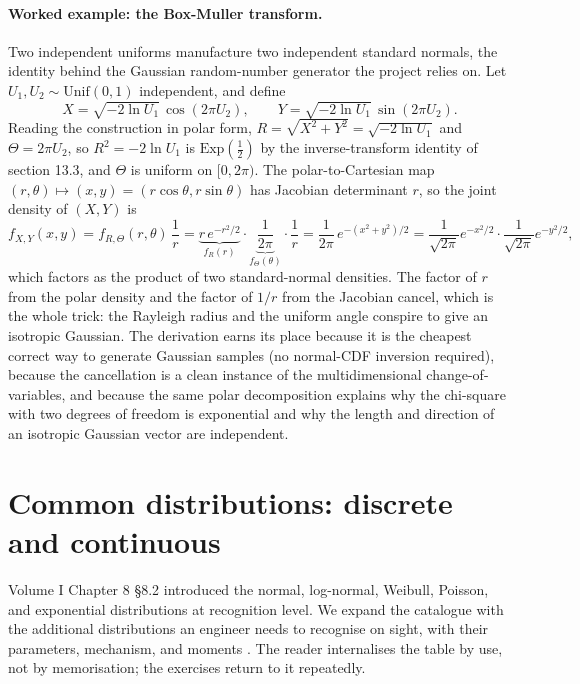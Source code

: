 \paragraph{Worked example: the Box-Muller transform.} Two independent
uniforms manufacture two independent standard normals, the identity
behind the Gaussian random-number generator the project relies on. Let
$U_{1}, U_{2} \sim \mathrm{Unif}(0, 1)$ independent, and define
\[
X = \sqrt{-2\ln U_{1}}\,\cos(2\pi U_{2}), \qquad
Y = \sqrt{-2\ln U_{1}}\,\sin(2\pi U_{2}).
\]
Reading the construction in polar form, $R = \sqrt{X^{2} + Y^{2}} =
\sqrt{-2\ln U_{1}}$ and $\Theta = 2\pi U_{2}$, so $R^{2} = -2\ln U_{1}$
is $\mathrm{Exp}(\tfrac12)$ by the inverse-transform identity of section
13.3, and $\Theta$ is uniform on $[0, 2\pi)$. The polar-to-Cartesian map
$(r, \theta) \mapsto (x, y) = (r\cos\theta, r\sin\theta)$ has Jacobian
determinant $r$, so the joint density of $(X, Y)$ is
\[
f_{X,Y}(x, y) = f_{R,\Theta}(r, \theta)\,\frac{1}{r}
= \underbrace{r\,e^{-r^{2}/2}}_{f_{R}(r)} \cdot
\underbrace{\frac{1}{2\pi}}_{f_{\Theta}(\theta)} \cdot \frac{1}{r}
= \frac{1}{2\pi}\,e^{-(x^{2}+y^{2})/2}
= \frac{1}{\sqrt{2\pi}}e^{-x^{2}/2}\cdot
\frac{1}{\sqrt{2\pi}}e^{-y^{2}/2},
\]
which factors as the product of two standard-normal densities. The
factor of $r$ from the polar density and the factor of $1/r$ from the
Jacobian cancel, which is the whole trick: the Rayleigh radius and the
uniform angle conspire to give an isotropic Gaussian. The derivation
earns its place because it is the cheapest correct way to generate
Gaussian samples (no normal-CDF inversion required), because the
cancellation is a clean instance of the multidimensional change-of-
variables, and because the same polar decomposition explains why the
chi-square with two degrees of freedom is exponential and why the
length and direction of an isotropic Gaussian vector are independent.



\section{Common distributions: discrete and continuous}

Volume I Chapter 8 §8.2 introduced the normal, log-normal, Weibull,
Poisson, and exponential distributions at recognition level. We
expand the catalogue with the additional distributions an engineer
needs to recognise on sight, with their parameters, mechanism, and
moments \cite[ch.~4-5]{text:ross-probability}. The reader internalises
the table by use, not by memorisation; the exercises return to it
repeatedly.

